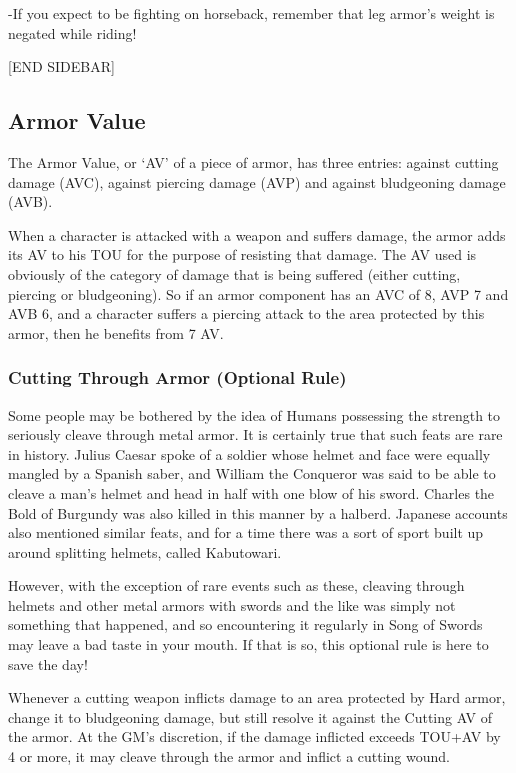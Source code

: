 \documentclass[oneside,11pt,english]{book}
\begin{document}
-If you expect to be fighting on horseback, remember that leg armor’s weight is negated while riding!

[END SIDEBAR]

\subsection{Armor Value}
The Armor Value, or ‘AV’ of a piece of armor, has three entries: against cutting damage (AVC), against piercing 
damage (AVP) and against bludgeoning damage (AVB).

When a character is attacked with a weapon and suffers damage, the armor adds its AV to his TOU for the purpose of 
resisting that damage. The AV used is obviously of the category of damage that is being suffered (either cutting, 
piercing or bludgeoning). So if an armor component has an AVC of 8, AVP 7 and AVB 6, and a character suffers a 
piercing attack to the area protected by this armor, then he benefits from 7 AV.

\subsubsection{Cutting Through Armor (Optional Rule)} %
Some people may be bothered by the idea of Humans possessing the strength to seriously cleave through metal armor.
It is certainly true that such feats are rare in history. Julius Caesar spoke of a soldier whose helmet and face were 
equally mangled by a Spanish saber, and William the Conqueror was said to be able to cleave a man’s helmet and 
head in half with one blow of his sword. Charles the Bold of Burgundy was also killed in this manner by a halberd. 
Japanese accounts also mentioned similar feats, and for a time there was a sort of sport built up around splitting 
helmets, called Kabutowari.

However, with the exception of rare events such as these, cleaving through helmets and other metal armors with 
swords and the like was simply not something that happened, and so encountering it regularly in Song of Swords may 
leave a bad taste in your mouth. If that is so, this optional rule is here to save the day! 

Whenever a cutting weapon inflicts damage to an area protected by Hard armor, change it to bludgeoning damage, but
still resolve it against the Cutting AV of the armor. At the GM’s discretion, if the damage inflicted exceeds TOU+AV 
by 4 or more, it may cleave through the armor and inflict a cutting wound.
\end{document}

